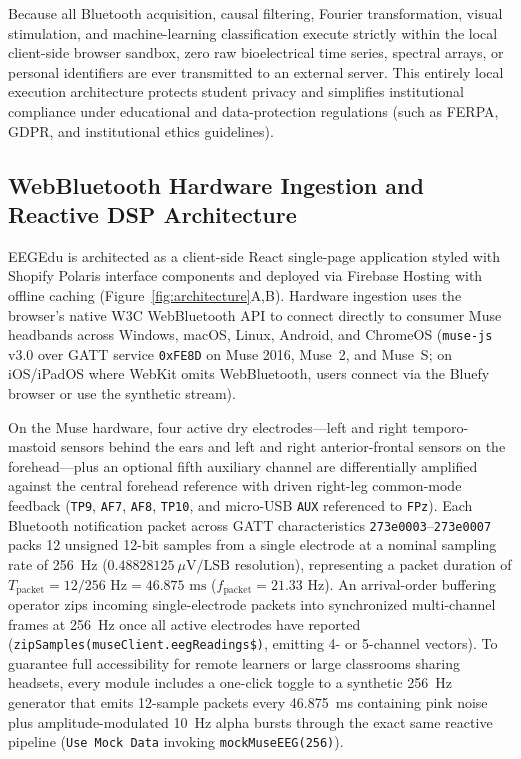\documentclass[11pt,letterpaper]{article}
\begin{document}
Because all Bluetooth acquisition, causal filtering, Fourier transformation, visual stimulation, and machine-learning classification execute strictly within the local client-side browser sandbox, zero raw bioelectrical time series, spectral arrays, or personal identifiers are ever transmitted to an external server. This entirely local execution architecture protects student privacy and simplifies institutional compliance under educational and data-protection regulations (such as FERPA, GDPR, and institutional ethics guidelines).

\subsection{WebBluetooth Hardware Ingestion and Reactive DSP Architecture}
EEGEdu is architected as a client-side React single-page application styled with Shopify Polaris interface components and deployed via Firebase Hosting with offline caching (Figure~\ref{fig:architecture}A,B). Hardware ingestion uses the browser's native W3C WebBluetooth API to connect directly to consumer Muse headbands across Windows, macOS, Linux, Android, and ChromeOS (\texttt{muse-js} v3.0 over GATT service \texttt{0xFE8D} on Muse 2016, Muse~2, and Muse~S; on iOS/iPadOS where WebKit omits WebBluetooth, users connect via the Bluefy browser or use the synthetic stream).

On the Muse hardware, four active dry electrodes---left and right temporo-mastoid sensors behind the ears and left and right anterior-frontal sensors on the forehead---plus an optional fifth auxiliary channel are differentially amplified against the central forehead reference with driven right-leg common-mode feedback (\texttt{TP9}, \texttt{AF7}, \texttt{AF8}, \texttt{TP10}, and micro-USB \texttt{AUX} referenced to \texttt{FPz}). Each Bluetooth notification packet across GATT characteristics \texttt{273e0003}--\texttt{273e0007} packs 12 unsigned 12-bit samples from a single electrode at a nominal sampling rate of 256~Hz ($0.48828125\ \mu\text{V/LSB}$ resolution), representing a packet duration of $T_{\text{packet}} = 12 / 256\text{ Hz} = 46.875\text{ ms}$ ($f_{\text{packet}} = 21.33\text{ Hz}$). An arrival-order buffering operator zips incoming single-electrode packets into synchronized multi-channel frames at 256~Hz once all active electrodes have reported (\texttt{zipSamples(museClient.eegReadings\$)}, emitting 4- or 5-channel vectors). To guarantee full accessibility for remote learners or large classrooms sharing headsets, every module includes a one-click toggle to a synthetic 256~Hz generator that emits 12-sample packets every 46.875~ms containing pink noise plus amplitude-modulated 10~Hz alpha bursts through the exact same reactive pipeline (\texttt{Use Mock Data} invoking \texttt{mockMuseEEG(256)}).
\end{document}
